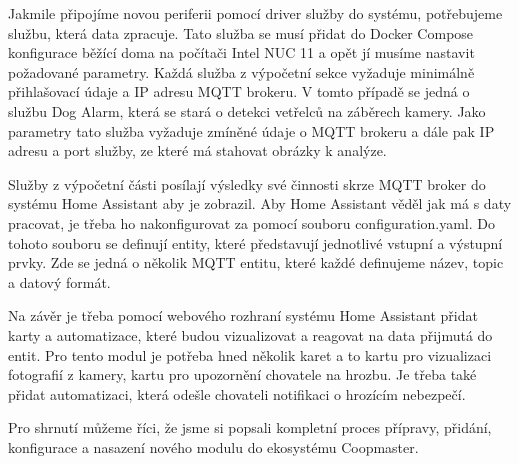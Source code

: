 Jakmile připojíme novou periferii pomocí driver služby do systému, potřebujeme službu, která data zpracuje.
Tato služba se musí přidat do Docker Compose konfigurace běžící doma na počítači Intel NUC 11 a opět jí musíme nastavit požadované parametry.
Každá služba z výpočetní sekce vyžaduje minimálně přihlašovací údaje a IP adresu MQTT brokeru.
V tomto případě se jedná o službu Dog Alarm, která se stará o detekci vetřelců na záběrech kamery.
Jako parametry tato služba vyžaduje zmíněné údaje o MQTT brokeru a dále pak IP adresu a port služby, ze které má stahovat obrázky k analýze.\newline

Služby z výpočetní části posílají výsledky své činnosti skrze MQTT broker do systému Home Assistant aby je zobrazil.
Aby Home Assistant věděl jak má s daty pracovat, je třeba ho nakonfigurovat za pomocí souboru configuration.yaml.
Do tohoto souboru se definují entity, které představují jednotlivé vstupní a výstupní prvky.
Zde se jedná o několik MQTT entitu, které každé definujeme název, topic a datový formát.\newline

Na závěr je třeba pomocí webového rozhraní systému Home Assistant přidat karty a automatizace, které budou vizualizovat a reagovat na data přijmutá do entit.
Pro tento modul je potřeba hned několik karet a to kartu pro vizualizaci fotografií z kamery, kartu pro upozornění chovatele na hrozbu.
Je třeba také přidat automatizaci, která odešle chovateli notifikaci o hrozícím nebezpečí.\newline

Pro shrnutí můžeme říci, že jsme si popsali kompletní proces přípravy, přidání, konfigurace a nasazení nového modulu do ekosystému Coopmaster.



